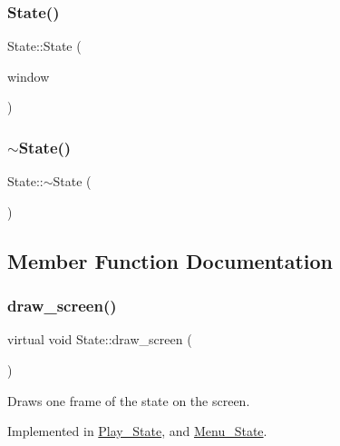 \subsubsection{\texorpdfstring{State()}{State()}}
{\footnotesize\ttfamily State\+::\+State (\begin{DoxyParamCaption}\item[{sf\+::\+Render\+Window $\ast$}]{window }\end{DoxyParamCaption})}

\mbox{\label{classState_afab438d92b90dc18d194dbd9c9c8bab3}} 
\subsubsection{\texorpdfstring{$\sim$\+State()}{~State()}}
{\footnotesize\ttfamily State\+::$\sim$\+State (\begin{DoxyParamCaption}{ }\end{DoxyParamCaption})\hspace{0.3cm}{\ttfamily [virtual]}}



\subsection{Member Function Documentation}
\mbox{\label{classState_a048a3b3ebeaf1c8a553040d42a61c48c}} 
\subsubsection{\texorpdfstring{draw\+\_\+screen()}{draw\_screen()}}
{\footnotesize\ttfamily virtual void State\+::draw\+\_\+screen (\begin{DoxyParamCaption}{ }\end{DoxyParamCaption})\hspace{0.3cm}{\ttfamily [pure virtual]}}

Draws one frame of the state on the screen. 

Implemented in \hyperlink{classPlay__State_a77ed7569adc8ab55ef2f6645cbdc94cf}{Play\+\_\+\+State}, and \hyperlink{classMenu__State_a30c6a5c755eea65e117b6c6772afad27}{Menu\+\_\+\+State}.

\mbox{\label{classState_a84fb17cf9f6a59c78e600b619670a0d9}} 
